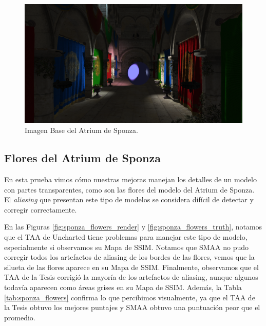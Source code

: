 \documentclass[pregrado]{tesis-usb} %
\begin{document}
\begin{figure}[!htb]
	\centering
	\includegraphics[scale=0.1]{images/results/sponza_sobel_ground_truth.png}
	\caption{Imagen Base del Atrium de Sponza.}\label{fig:sponza_truth}
\end{figure}

\FloatBarrier

\subsection{Flores del Atrium de Sponza}
En esta prueba vimos cómo nuestras mejoras manejan los detalles de un modelo con partes transparentes, como son las flores del modelo del Atrium de Sponza. El \textit{aliasing} que presentan este tipo de modelos se considera difícil de detectar y corregir correctamente. 

En las Figuras \ref{fig:sponza_flowers_render} y \ref{fig:sponza_flowers_truth}, notamos que el TAA de Uncharted tiene problemas para manejar este tipo de modelo, especialmente si observamos su Mapa de SSIM. Notamos que SMAA no pudo corregir todos los artefactos de aliasing de los bordes de las flores, vemos que la silueta de las flores aparece en su Mapa de SSIM.  Finalmente, observamos que el TAA de la Tesis corrigió la mayoría de los artefactos de aliasing, aunque algunos todavía aparecen como áreas grises en su Mapa de SSIM. Además, la Tabla \ref{tab:sponza_flowers} confirma lo que percibimos visualmente, ya que el TAA de la Tesis obtuvo los mejores puntajes y SMAA obtuvo una puntuación peor que el promedio.
\end{document}

